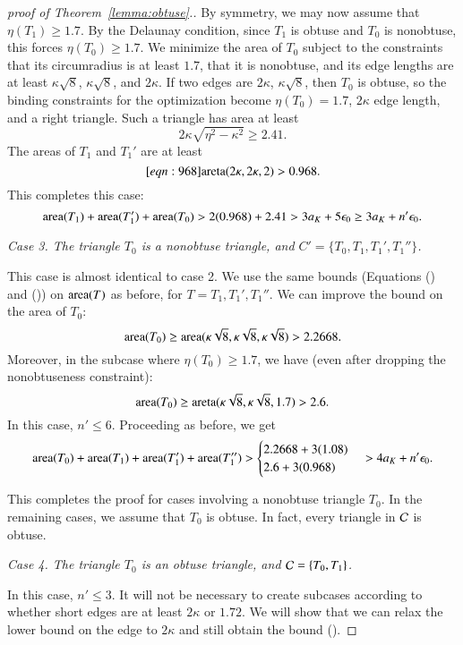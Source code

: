 \begin{proof}[proof of Theorem~\ref{lemma:obtuse}.]
By symmetry, we may now assume that $\eta(T_1) \ge 1.7$.  By the
Delaunay condition, since $T_1$ is obtuse and $T_0$ is nonobtuse, this
forces $\eta(T_0)\ge 1.7$.  We minimize the area of $T_0$ subject to
the constraints that its circumradius is at least $1.7$, that it is
nonobtuse, and its edge lengths are at least $\kappa\sqrt{8}$,
$\kappa\sqrt{8}$, and $2\kappa$.  If two edges are $2\kappa$,
$\kappa\sqrt{8}$, then $T_0$ is obtuse, so the binding constraints for
the optimization become $\eta(T_0)=1.7$, $2\kappa$ edge length, and a
right triangle.  Such a triangle has area at least 
\[
2\kappa\sqrt{\eta^2 - \kappa^2} \ge 2.41.
\]  
The areas of $T_1$ and $T_1'$ are at least
\begin{equation}\libel{eqn:968}
\areta(2\kappa,2\kappa,2) > 0.968.
\end{equation}
This completes this case:
\[
{\operatorname{area}}(T_1) + {\operatorname{area}}(T_1') + {\operatorname{area}}(T_0) 
>
2(0.968) + 2.41 > 3a_K + 5 \epsilon_0 \ge 3a_K + n'\epsilon_0.
\] %

{\it Case 3. The triangle $T_0$ is a nonobtuse triangle, and $C'=\{T_0,T_1,T_1',T_1''\}$.}

This case is almost identical to case 2.  We use the same bounds
(Equations () and ()) on ${\operatorname{area}}(T)$ as
before, for $T = T_1, T_1', T_1''$.  We can improve the bound on the
area of $T_0$:
\[
{\operatorname{area}}(T_0) \ge {\operatorname{area}}(\kappa\sqrt{8},\kappa\sqrt{8},\kappa\sqrt{8}) > 2.2668.
\]
Moreover, in the subcase where $\eta(T_0)\ge 1.7$, we have
(even after dropping the nonobtuseness constraint):
\[
{\operatorname{area}}(T_0) \ge {\operatorname{areta}}(\kappa\sqrt{8},\kappa\sqrt{8},1.7) > 2.6.
\]
In this case, $n'\le 6$.  Proceeding as before, we get
\[
{\operatorname{area}}(T_0)  + {\operatorname{area}}(T_1) + {\operatorname{area}}(T_1') + {\operatorname{area}}(T_1'') > 
\begin{cases}
2.2668 + 3 (1.08) \\
2.6 + 3(0.968)
\end{cases}
> 4a_K + n' \epsilon_0.
\] %


This completes the proof for cases involving a nonobtuse triangle
$T_0$.  In the remaining cases, we assume that $T_0$ is obtuse.  In
fact, every triangle in $\mathcal C$ is obtuse.

{\it Case 4. The triangle $T_0$ is an obtuse triangle, and $\mathcal C=\{T_0,T_1\}$.}  

In this case, $n'\le 3$.  It will not be necessary to create subcases
according to whether short edges are at least $2\kappa$ or $1.72$.  We
will show that we can relax the lower bound on the edge to $2\kappa$
and still obtain the bound ().


\end{proof}
